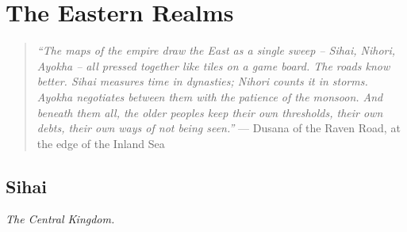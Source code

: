 \part{The Eastern Realms}
\begin{quote}
  \small
  \textit{``The maps of the empire draw the East as a single sweep -- Sihai, Nihori, Ayokha -- all pressed together like tiles on a game board. The roads know better. Sihai measures time in dynasties; Nihori counts it in storms. Ayokha negotiates between them with the patience of the monsoon. And beneath them all, the older peoples keep their own thresholds, their own debts, their own ways of not being seen.''}
  \noindent --- Dusana of the Raven Road, at the edge of the Inland Sea
  \end{quote}
\chapter{Sihai}
\emph{The Central Kingdom.}

